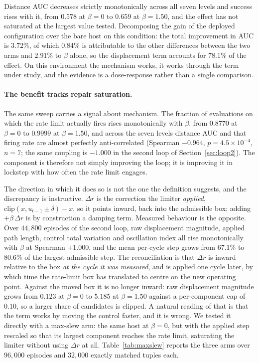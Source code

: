 \documentclass[11pt,a4paper]{article}
\begin{document}
Distance AUC decreases strictly monotonically across all seven levels and success rises
with it, from $0.578$ at $\beta = 0$ to $0.659$ at $\beta = 1.50$, and the effect has not
saturated at the largest value tested. Decomposing the gain of the deployed configuration
over the bare host on this condition: the total improvement in AUC is $3.72\%$, of which
$0.84\%$ is attributable to the other differences between the two arms and $2.91\%$ to
$\beta$ alone, so the displacement term accounts for $78.1\%$ of the effect. On this
environment the mechanism works, it works through the term under study, and the evidence
is a dose-response rather than a single comparison.

\paragraph{The benefit tracks repair saturation.} The same sweep carries a signal about
mechanism. The fraction of evaluations on which the rate limit actually fires rises
monotonically with $\beta$, from $0.8770$ at $\beta = 0$ to $0.9999$ at $\beta = 1.50$, and
across the seven levels distance AUC and that firing rate are almost perfectly
anti-correlated (Spearman $-0.964$, $p = 4.5 \times 10^{-4}$, $n = 7$; the same coupling is
$-1.000$ in the second loop of Section~\ref{sec:loop2}). The component is
therefore not simply improving the loop; it is improving it in lockstep with how often the
rate limit engages.

The direction in which it does so is not the one the definition suggests, and the
discrepancy is instructive. $\Delta r$ is the correction the limiter \emph{applied},
$\mathrm{clip}(x, u_{t-1} \pm \delta) - x$, so it points inward, back into the admissible
box; adding $+\beta\,\Delta r$ is by construction a damping term. Measured behaviour is the
opposite. Over $44{,}800$ episodes of the second loop, raw displacement magnitude, applied
path length, control total variation and oscillation index all rise monotonically with
$\beta$ at Spearman $+1.000$, and the mean per-cycle step grows from $67.1\%$ to $80.6\%$ of
the largest admissible step. The reconciliation is that $\Delta r$ is inward relative to the
box \emph{at the cycle it was measured}, and is applied one cycle later, by which time the
rate-limit box has translated to centre on the new operating point. Against the moved box it
is no longer inward: raw displacement magnitude grows from $0.123$ at $\beta=0$ to $5.185$ at
$\beta=1.50$ against a per-component cap of $0.10$, so a larger share of candidates is
clipped. A natural reading of that is that the term works by moving the control faster, and
it is wrong. We tested it directly with a max-slew arm: the same host at $\beta = 0$, but with
the applied step rescaled so that its largest component reaches the rate limit, saturating
the limiter without using $\Delta r$ at all. Table~\ref{tab:maxslew} reports the three arms
over $96{,}000$ episodes and $32{,}000$ exactly matched tuples each.
\end{document}
